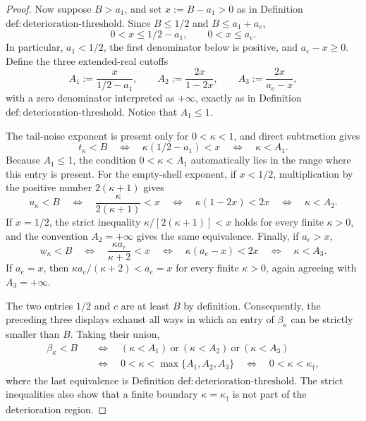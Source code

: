 \documentclass{article}
\begin{document}
\begin{proof}
Now suppose \(B>a_1\), and set \(x:=B-a_1>0\) as in Definition \(\mathrm{def{:}deterioration\mbox{-}threshold}\).  Since \(B\leq1/2\) and \(B\leq a_1+a_e\),
\[
0<x\leq 1/2-a_1,
\qquad
0<x\leq a_e.
\]
In particular, \(a_1<1/2\), the first denominator below is positive, and \(a_e-x\geq0\).  Define the three extended-real cutoffs
\[
A_1:=\frac{x}{1/2-a_1},
\qquad
A_2:=\frac{2x}{1-2x},
\qquad
A_3:=\frac{2x}{a_e-x},
\]
with a zero denominator interpreted as \(+\infty\), exactly as in Definition \(\mathrm{def{:}deterioration\mbox{-}threshold}\).  Notice that \(A_1\leq1\).

The tail-noise exponent is present only for \(0<\kappa<1\), and direct subtraction gives
\[
t_\kappa<B
\quad\Longleftrightarrow\quad
\kappa(1/2-a_1)<x
\quad\Longleftrightarrow\quad
\kappa<A_1.
\]
Because \(A_1\leq1\), the condition \(0<\kappa<A_1\) automatically lies in the range where this entry is present.  For the empty-shell exponent, if \(x<1/2\), multiplication by the positive number \(2(\kappa+1)\) gives
\[
u_\kappa<B
\quad\Longleftrightarrow\quad
\frac{\kappa}{2(\kappa+1)}<x
\quad\Longleftrightarrow\quad
\kappa(1-2x)<2x
\quad\Longleftrightarrow\quad
\kappa<A_2.
\]
If \(x=1/2\), the strict inequality \(\kappa/[2(\kappa+1)]<x\) holds for every finite \(\kappa>0\), and the convention \(A_2=+\infty\) gives the same equivalence.  Finally, if \(a_e>x\),
\[
w_\kappa<B
\quad\Longleftrightarrow\quad
\frac{\kappa a_e}{\kappa+2}<x
\quad\Longleftrightarrow\quad
\kappa(a_e-x)<2x
\quad\Longleftrightarrow\quad
\kappa<A_3.
\]
If \(a_e=x\), then \(\kappa a_e/(\kappa+2)<a_e=x\) for every finite \(\kappa>0\), again agreeing with \(A_3=+\infty\).

The two entries \(1/2\) and \(c\) are at least \(B\) by definition.  Consequently, the preceding three displays exhaust all ways in which an entry of \(\beta_\kappa\) can be strictly smaller than \(B\).  Taking their union,
\[
\begin{aligned}
\beta_\kappa<B
&\quad\Longleftrightarrow\quad
(\kappa<A_1)\ \text{or}\ (\kappa<A_2)\ \text{or}\ (\kappa<A_3)\\
&\quad\Longleftrightarrow\quad
0<\kappa<\max\{A_1,A_2,A_3\}
\quad\Longleftrightarrow\quad
0<\kappa<\kappa_\dagger,
\end{aligned}
\]
where the last equivalence is Definition \(\mathrm{def{:}deterioration\mbox{-}threshold}\).  The strict inequalities also show that a finite boundary \(\kappa=\kappa_\dagger\) is not part of the deterioration region.


\end{proof}
\end{document}
